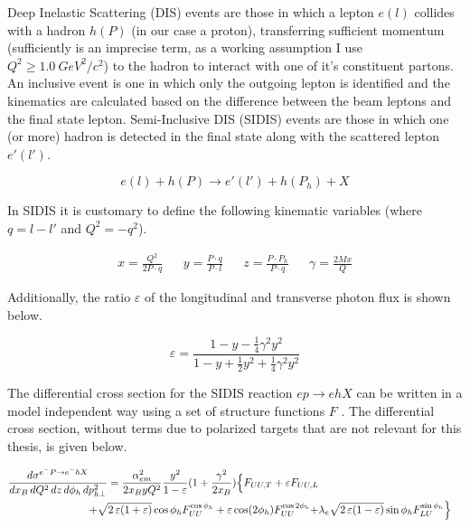 Deep Inelastic Scattering (DIS) events are those in which a lepton $e(l)$ collides with a hadron $h(P)$ (in our case a proton), transferring sufficient momentum (sufficiently is an imprecise term, as a working assumption I use $Q^{2} \geq 1.0 \: GeV^{2}/c^{2}$) to the hadron to interact with one of it's constituent partons.  An inclusive event is one in which only the outgoing lepton is identified and the kinematics are calculated based on the difference between the beam leptons and the final state lepton.  Semi-Inclusive DIS (SIDIS) events are those in which one (or more) hadron is detected in the final state along with the scattered lepton $e'(l')$.  

\begin{equation}
  e(l) + h(P) \rightarrow e'(l') + h(P_{h}) + X 
\end{equation}

In SIDIS it is customary to define the following kinematic variables (where $q = l - l'$ and $Q^{2} = -q^{2}$). 

\begin{align}
  x = \frac{Q^{2}}{2P \cdot q} && y = \frac{P \cdot q}{P \cdot l} && z = \frac{P \cdot P_{h}}{P \cdot q} && \gamma = \frac{2Mx}{Q}
\end{align}

Additionally, the ratio $\varepsilon$ of the longitudinal and transverse photon flux is shown below.

\begin{equation}
	\varepsilon = \frac{1 - y - \frac{1}{4}\gamma^2 y^2}{1 - y + \frac{1}{2}y^2 + \frac{1}{4}\gamma^2 y^2}
\end{equation}

The differential cross section for the SIDIS reaction $ep \rightarrow ehX$ can be written in a model independent way using a set of structure functions $F$ \cite{tmds-mulders:1995}.  The differential cross section, without terms due to polarized targets that are not relevant for this thesis, is given below.

\begin{eqnarray}
  \frac{d\sigma^{e^-P\to e^-hX}}{dx_B \, dQ^{2}\, dz\, d\phi_h\, d p_{h\perp}^2} = \frac{\alpha^2_{em}}{2x_B y Q^2} \frac{y^2}{1-\varepsilon}  ( 1+\frac{\gamma^2}{2x_B} ) \Bigl\{ F_{UU ,T} +  \varepsilon F_{UU ,L} \nonumber \\
  + \sqrt{2\,\varepsilon (1+\varepsilon)} \cos\phi_h F_{UU}^{\cos\phi_h}+ \varepsilon \cos(2\phi_h) F_{UU}^{\cos 2\phi_h} +& \lambda_e
\sqrt{2\,\varepsilon (1-\varepsilon)} \sin\phi_h F_{LU}^{\sin\phi_h} \Bigr\}
\end{eqnarray}

